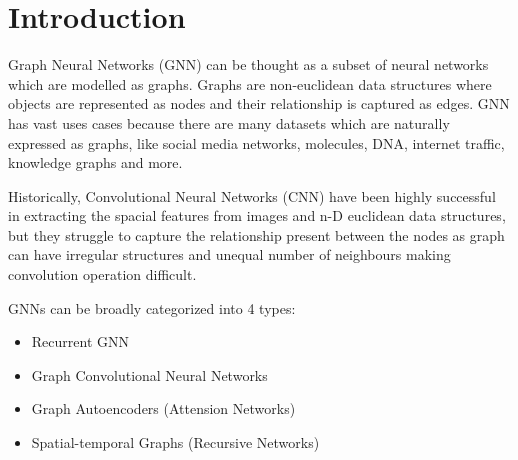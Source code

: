 \section{Introduction}

Graph Neural Networks (GNN) can be thought as a subset of neural networks which are modelled as graphs. Graphs are non-euclidean data structures where objects are represented as nodes and their relationship is captured as edges. GNN has vast uses cases because there are many datasets which are naturally expressed as graphs, like social media networks, molecules, DNA, internet traffic, knowledge graphs and more.

Historically, Convolutional Neural Networks (CNN) have been highly successful in extracting the spacial features from images and n-D euclidean data structures, but they struggle to capture the relationship present between the nodes as graph can have irregular structures and unequal number of neighbours making convolution operation difficult. 


GNNs can be broadly categorized into 4 types:
\begin{itemize}
    \item Recurrent GNN
    \item Graph Convolutional Neural Networks
    \item Graph Autoencoders (Attension Networks)
    \item Spatial-temporal Graphs (Recursive Networks)
\end{itemize}